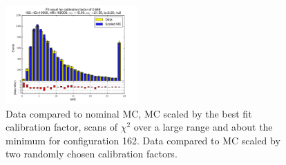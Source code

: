 \begin{figure}[htbp]
\begin{center}
\includegraphics[width=0.45\textwidth]{../FIGURES/162/FIG_Fit_result_for_calibration_factor_of_0_666.pdf} 
\caption{Data compared to nominal MC, MC scaled by the best fit calibration factor, scans of $\chi^2$ over a large range and about the minimum for configuration 162. Data compared to MC scaled by two randomly chosen calibration factors.} 
\label{tab:best_162} 
\end{center} \end{figure} 

